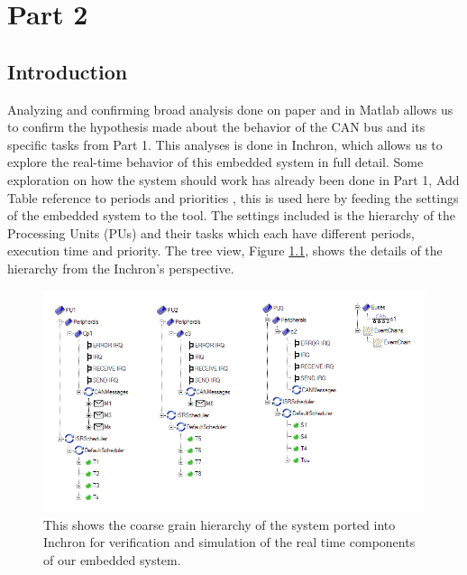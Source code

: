 \chapter{Part 2}


\section{Introduction}

Analyzing and confirming broad analysis done on paper and in Matlab allows us to confirm the hypothesis made about the behavior of the CAN bus and its specific tasks from Part 1. This analyses is done in Inchron, which allows us to explore the real-time behavior of this embedded system in full detail. Some exploration on how the system should work has already been done in Part 1, \color{red} Add Table reference to periods and priorities \color{black}, this is used here by feeding the settings of the embedded system to the tool. The settings included is the hierarchy of the Processing Units (PUs) and their tasks which each have different periods, execution time and priority. The tree view, Figure \ref{fig:treeCAN}, shows the details of the hierarchy from the Inchron's perspective.

\begin{figure}[h!]
	\begin{center}
		\includegraphics[width=0.75\linewidth]{img/treeCAN}
		\caption{This shows the coarse grain hierarchy of the system ported into Inchron for verification and simulation of the real time components of our embedded system.}
		\label{fig:treeCAN}
	\end{center}
\end{figure}




